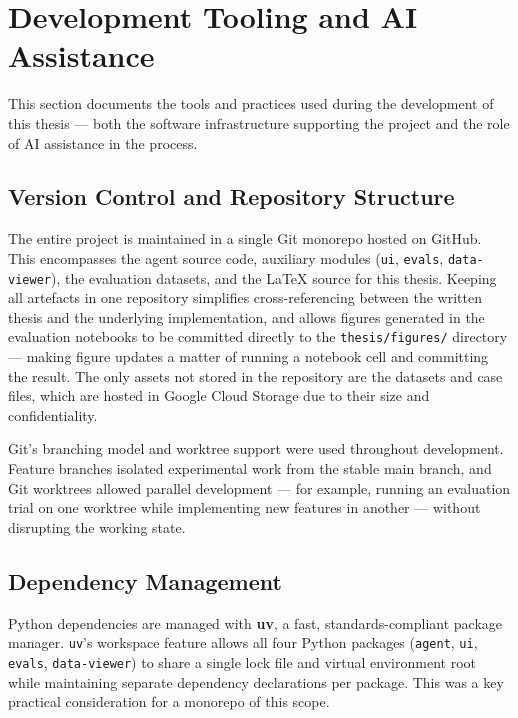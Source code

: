
\section{Development Tooling and AI Assistance}

This section documents the tools and practices used during the development of this thesis — both the software infrastructure supporting the project and the role of AI assistance in the process.

\subsection{Version Control and Repository Structure}

The entire project is maintained in a single Git monorepo hosted on GitHub. This encompasses the agent source code, auxiliary modules (\texttt{ui}, \texttt{evals}, \texttt{data-viewer}), the evaluation datasets, and the \LaTeX{} source for this thesis. Keeping all artefacts in one repository simplifies cross-referencing between the written thesis and the underlying implementation, and allows figures generated in the evaluation notebooks to be committed directly to the \texttt{thesis/figures/} directory — making figure updates a matter of running a notebook cell and committing the result. The only assets not stored in the repository are the datasets and case files, which are hosted in Google Cloud Storage due to their size and confidentiality.

Git's branching model and worktree support were used throughout development. Feature branches isolated experimental work from the stable main branch, and Git worktrees allowed parallel development — for example, running an evaluation trial on one worktree while implementing new features in another — without disrupting the working state.

\subsection{Dependency Management}

Python dependencies are managed with \textbf{uv}, a fast, standards-compliant package manager. \texttt{uv}'s workspace feature allows all four Python packages (\texttt{agent}, \texttt{ui}, \texttt{evals}, \texttt{data-viewer}) to share a single lock file and virtual environment root while maintaining separate dependency declarations per package. This was a key practical consideration for a monorepo of this scope.

